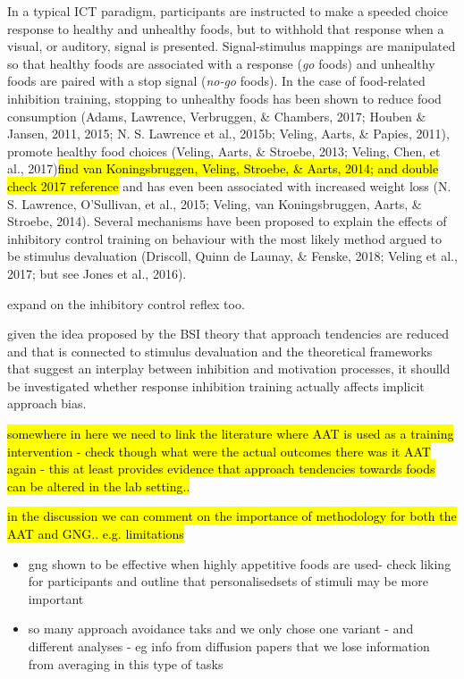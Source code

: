 \documentclass[man,floatsintext]{apa6}
\providecommand{\tightlist}{%
  \setlength{\itemsep}{0pt}\setlength{\parskip}{0pt}}
\begin{document}
In a typical ICT paradigm, participants are instructed to make a speeded choice response to healthy and unhealthy foods, but to withhold that response when a visual, or auditory, signal is presented. Signal-stimulus mappings are manipulated so that healthy foods are associated with a response (\textit{go} foods) and unhealthy foods are paired with a stop signal (\textit{no-go} foods). In the case of food-related inhibition training, stopping to unhealthy foods has been shown to reduce food consumption (Adams, Lawrence, Verbruggen, \& Chambers, 2017; Houben \& Jansen, 2011, 2015; N. S. Lawrence et al., 2015b; Veling, Aarts, \& Papies, 2011), promote healthy food choices (Veling, Aarts, \& Stroebe, 2013; Veling, Chen, et al., 2017)\hl{find van Koningsbruggen, Veling, Stroebe, \& Aarts, 2014; and double check 2017 reference} and has even been associated with increased weight loss (N. S. Lawrence, O'Sullivan, et al., 2015; Veling, van Koningsbruggen, Aarts, \& Stroebe, 2014). Several mechanisms have been proposed to explain the effects of inhibitory control training on behaviour with the most likely method argued to be stimulus devaluation (Driscoll, Quinn de Launay, \& Fenske, 2018; Veling et al., 2017; but see Jones et al., 2016).

expand on the inhibitory control reflex too.

given the idea proposed by the BSI theory that approach tendencies are reduced and that is connected to stimulus devaluation and the theoretical frameworks that suggest an interplay between inhibition and motivation processes, it shoulld be investigated whether response inhibition training actually affects implicit approach bias.

\hl{somewhere in here we need to link the literature where AAT is used as a training intervention - check though what were the actual outcomes there was it AAT again - this at least provides evidence that approach tendencies towards foods can be altered in the lab setting..}

\hl{in the discussion we can comment on the importance of methodology for both the AAT and GNG.. e.g. limitations}

\begin{itemize}
\tightlist
\item
  gng shown to be effective when highly appetitive foods are used- check liking for participants and outline that personalisedsets of stimuli may be more important
\item
  so many approach avoidance taks and we only chose one variant - and different analyses - eg info from diffusion papers that we lose information from averaging in this type of tasks
\end{itemize}
\end{document}

